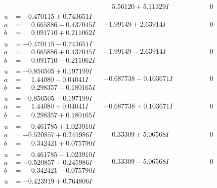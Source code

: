 \documentclass[1p]{elsarticle_modified}
\theoremstyle{definition}
\begin{document}
$$\begin{array}{c|c|c}
 & \phantom{-}5.56120 + 5.11329 I & \phantom{-0.000000 } 0 \\ \hline\begin{aligned}
u &= -0.470115 + 0.743651 I \\
a &= \phantom{-}0.665886 - 0.437045 I \\
b &= \phantom{-}0.091710 + 0.211062 I\end{aligned}
 & -1.99149 + 2.63914 I & \phantom{-0.000000 } 0 \\ \hline\begin{aligned}
u &= -0.470115 - 0.743651 I \\
a &= \phantom{-}0.665886 + 0.437045 I \\
b &= \phantom{-}0.091710 - 0.211062 I\end{aligned}
 & -1.99149 - 2.63914 I & \phantom{-0.000000 } 0 \\ \hline\begin{aligned}
u &= -0.856505 + 0.197199 I \\
a &= \phantom{-}1.44080 - 0.04041 I \\
b &= \phantom{-}0.298357 - 0.180165 I\end{aligned}
 & -0.687738 - 0.103671 I & \phantom{-0.000000 } 0 \\ \hline\begin{aligned}
u &= -0.856505 - 0.197199 I \\
a &= \phantom{-}1.44080 + 0.04041 I \\
b &= \phantom{-}0.298357 + 0.180165 I\end{aligned}
 & -0.687738 + 0.103671 I & \phantom{-0.000000 } 0 \\ \hline\begin{aligned}
u &= \phantom{-}0.461785 + 1.023910 I \\
a &= -0.520857 + 0.245986 I \\
b &= \phantom{-}0.342421 + 0.075790 I\end{aligned}
 & \phantom{-}0.33309 + 5.06568 I & \phantom{-0.000000 } 0 \\ \hline\begin{aligned}
u &= \phantom{-}0.461785 - 1.023910 I \\
a &= -0.520857 - 0.245986 I \\
b &= \phantom{-}0.342421 - 0.075790 I\end{aligned}
 & \phantom{-}0.33309 - 5.06568 I & \phantom{-0.000000 } 0 \\ \hline\begin{aligned}
u &= -0.423919 + 0.764806 I \\

\end{aligned}
\end{array}$$
\end{document}
